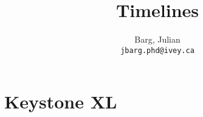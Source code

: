\documentclass{article}
\title{Timelines}
\author{
	Barg, Julian\\
	\texttt{jbarg.phd@ivey.ca}
}
\begin{document}
	\maketitle

	\newpage

	

	\section*{Keystone XL}

	

	

	

	



	\clearpage
	\printbibliography
\end{document}
